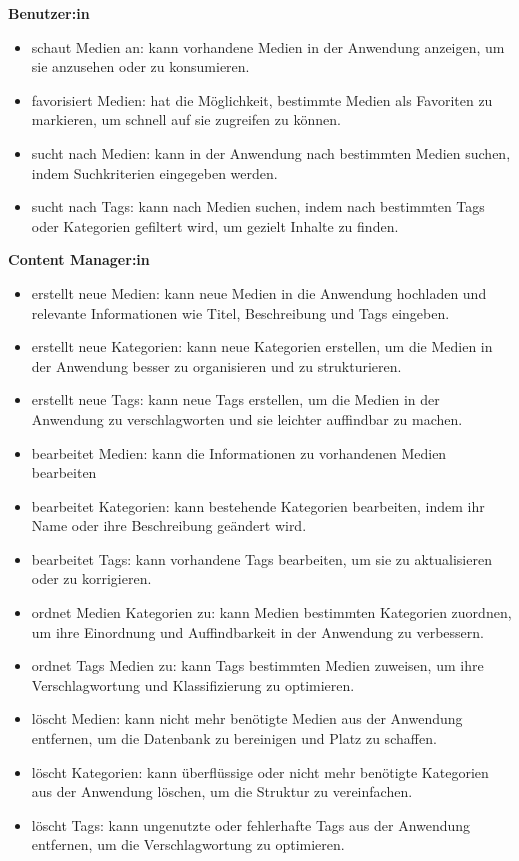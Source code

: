 \textbf{Benutzer:in}
\begin{itemize}
    \item schaut Medien an: kann vorhandene Medien in der Anwendung anzeigen, um sie anzusehen oder zu konsumieren.
    \item favorisiert Medien: hat die Möglichkeit, bestimmte Medien als Favoriten zu markieren, um schnell auf sie zugreifen zu können.
    \item sucht nach Medien: kann in der Anwendung nach bestimmten Medien suchen, indem Suchkriterien eingegeben werden.
    \item sucht nach Tags: kann nach Medien suchen, indem nach bestimmten Tags oder Kategorien gefiltert wird, um gezielt Inhalte zu finden.
\end{itemize}
\textbf{Content Manager:in}
\begin{itemize}
    \item erstellt neue Medien: kann neue Medien in die Anwendung hochladen und relevante Informationen wie Titel, Beschreibung und Tags eingeben.
    \item erstellt neue Kategorien: kann neue Kategorien erstellen, um die Medien in der Anwendung besser zu organisieren und zu strukturieren.
    \item erstellt neue Tags: kann neue Tags erstellen, um die Medien in der Anwendung zu verschlagworten und sie leichter auffindbar zu machen.
    \item bearbeitet Medien: kann die Informationen zu vorhandenen Medien bearbeiten
    \item bearbeitet Kategorien: kann bestehende Kategorien bearbeiten, indem ihr Name oder ihre Beschreibung geändert wird.
    \item bearbeitet Tags: kann vorhandene Tags bearbeiten, um sie zu aktualisieren oder zu korrigieren.
    \item ordnet Medien Kategorien zu: kann Medien bestimmten Kategorien zuordnen, um ihre Einordnung und Auffindbarkeit in der Anwendung zu verbessern.
    \item ordnet Tags Medien zu: kann Tags bestimmten Medien zuweisen, um ihre Verschlagwortung und Klassifizierung zu optimieren.
    \item löscht Medien: kann nicht mehr benötigte Medien aus der Anwendung entfernen, um die Datenbank zu bereinigen und Platz zu schaffen.
    \item löscht Kategorien: kann überflüssige oder nicht mehr benötigte Kategorien aus der Anwendung löschen, um die Struktur zu vereinfachen.
    \item löscht Tags: kann ungenutzte oder fehlerhafte Tags aus der Anwendung entfernen, um die Verschlagwortung zu optimieren.
\end{itemize}
